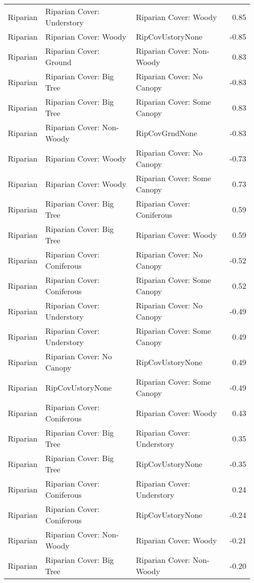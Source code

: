 \documentclass[
  12pt,
]{article}
\begin{document}
\begin{longtable}[t]{>{\raggedright\arraybackslash}p{1in}>{\raggedright\arraybackslash}p{2in}>{\raggedright\arraybackslash}p{2in}r}
Riparian & Riparian Cover: Understory & Riparian Cover: Woody & 0.85\\
Riparian & Riparian Cover: Woody & RipCovUstoryNone & -0.85\\
Riparian & Riparian Cover: Ground & Riparian Cover: Non-Woody & 0.83\\
\addlinespace
Riparian & Riparian Cover: Big Tree & Riparian Cover: No Canopy & -0.83\\
Riparian & Riparian Cover: Big Tree & Riparian Cover: Some Canopy & 0.83\\
Riparian & Riparian Cover: Non-Woody & RipCovGrndNone & -0.83\\
Riparian & Riparian Cover: Woody & Riparian Cover: No Canopy & -0.73\\
Riparian & Riparian Cover: Woody & Riparian Cover: Some Canopy & 0.73\\
\addlinespace
Riparian & Riparian Cover: Big Tree & Riparian Cover: Coniferous & 0.59\\
Riparian & Riparian Cover: Big Tree & Riparian Cover: Woody & 0.59\\
Riparian & Riparian Cover: Coniferous & Riparian Cover: No Canopy & -0.52\\
Riparian & Riparian Cover: Coniferous & Riparian Cover: Some Canopy & 0.52\\
Riparian & Riparian Cover: Understory & Riparian Cover: No Canopy & -0.49\\
\addlinespace
Riparian & Riparian Cover: Understory & Riparian Cover: Some Canopy & 0.49\\
Riparian & Riparian Cover: No Canopy & RipCovUstoryNone & 0.49\\
Riparian & RipCovUstoryNone & Riparian Cover: Some Canopy & -0.49\\
Riparian & Riparian Cover: Coniferous & Riparian Cover: Woody & 0.43\\
Riparian & Riparian Cover: Big Tree & Riparian Cover: Understory & 0.35\\
\addlinespace
Riparian & Riparian Cover: Big Tree & RipCovUstoryNone & -0.35\\
Riparian & Riparian Cover: Coniferous & Riparian Cover: Understory & 0.24\\
Riparian & Riparian Cover: Coniferous & RipCovUstoryNone & -0.24\\
Riparian & Riparian Cover: Non-Woody & Riparian Cover: Woody & -0.21\\
Riparian & Riparian Cover: Big Tree & Riparian Cover: Non-Woody & -0.20\\

\end{longtable}
\end{document}
